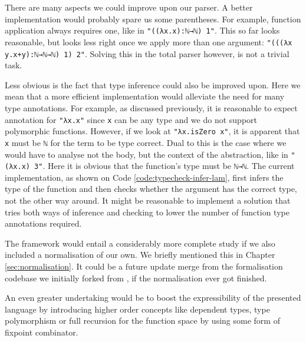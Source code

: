 There are many aspects we could improve upon our parser. A better implementation would probably spare us some parentheses. For example, function application always requires one, like in \verb$"((λx.x):ℕ→ℕ) 1"$. This so far looks reasonable, but looks less right once we apply more than one argument: \verb$"(((λx y.x+y):ℕ→ℕ→ℕ) 1) 2"$. Solving this in the total parser however, is not a trivial task.

Less obvious is the fact that type inference could also be improved upon. Here we mean that a more efficient implementation would alleviate the need for many type annotations. For example, as discussed previously, it is reasonable to expect annotation for \verb$"λx.x"$ since \verb$x$ can be any type and we do not support polymorphic functions. However, if we look at \verb$"λx.isZero x"$, it is apparent that \verb$x$ must be \verb$ℕ$ for the term to be type correct. Dual to this is the case where we would have to analyse not the body, but the context of the abstraction, like in \verb$"(λx.x) 3"$. Here it is obvious that the function's type must be \verb$ℕ→ℕ$. The current implementation, as shown on Code \ref{code:typecheck-infer-lam}, first infers the type of the function and then checks whether the argument has the correct type, not the other way around. It might be reasonable to implement a solution that tries both ways of inference and checking to lower the number of function type annotations required.

The framework would entail a considerably more complete study if we also included a normalisation of our own. We briefly mentioned this in Chapter \ref{sec:normalisation}. It could be a future update merge from the formalisation codebase we initially forked from \cite{typesystems-repo}, if the normalisation ever got finished.

An even greater undertaking would be to boost the expressibility of the presented language by introducing higher order concepts like dependent types, type polymorphism or full recursion for the function space by using some form of fixpoint combinator.

